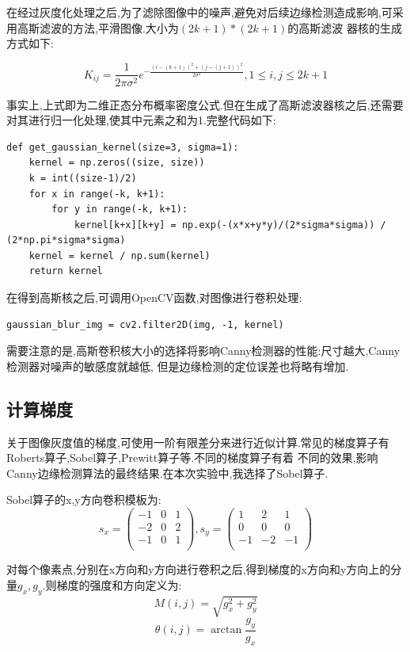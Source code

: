\documentclass[a4paper]{article}
\begin{document}
在经过灰度化处理之后,为了滤除图像中的噪声,避免对后续边缘检测造成影响,可采用高斯滤波的方法,平滑图像.大小为$(2k+1)*(2k+1)$的高斯滤波
器核的生成方式如下:

$$K_{ij} = \frac{1}{2\pi \sigma^{2}}e^{-\frac{(i-(k+1))^2 + (j-(j+1))^2}{2\sigma^2}},1\leq i,j \leq 2k+1$$

事实上,上式即为二维正态分布概率密度公式.但在生成了高斯滤波器核之后,还需要对其进行归一化处理,使其中元素之和为1.完整代码如下:

\begin{verbatim}
def get_gaussian_kernel(size=3, sigma=1):
    kernel = np.zeros((size, size))
    k = int((size-1)/2)
    for x in range(-k, k+1):
        for y in range(-k, k+1):
            kernel[k+x][k+y] = np.exp(-(x*x+y*y)/(2*sigma*sigma)) / (2*np.pi*sigma*sigma)
    kernel = kernel / np.sum(kernel)
    return kernel
\end{verbatim}

在得到高斯核之后,可调用OpenCV函数,对图像进行卷积处理:
\begin{verbatim}
gaussian_blur_img = cv2.filter2D(img, -1, kernel)
\end{verbatim}

需要注意的是,高斯卷积核大小的选择将影响Canny检测器的性能:尺寸越大,Canny检测器对噪声的敏感度就越低,
但是边缘检测的定位误差也将略有增加.

        \subsection{计算梯度}
关于图像灰度值的梯度,可使用一阶有限差分来进行近似计算.常见的梯度算子有Roberts算子,Sobel算子,Prewitt算子等.不同的梯度算子有着
不同的效果,影响Canny边缘检测算法的最终结果.在本次实验中,我选择了Sobel算子.

Sobel算子的x,y方向卷积模板为:
$$
s_x = 
\begin{pmatrix}
-1 & 0 & 1\\
-2 & 0 & 2\\ 
-1 & 0 & 1\\
\end{pmatrix} ,
s_y =
\begin{pmatrix}
1 & 2 & 1\\
0 & 0 & 0 \\
-1 & -2 & -1\\
\end{pmatrix} 
$$

对每个像素点,分别在x方向和y方向进行卷积之后,得到梯度的x方向和y方向上的分量$g_x,g_y$.则梯度的强度和方向定义为:
$$M(i,j) = \sqrt{g_{x}^{2} + g_{y}^{2}}$$
$$\theta(i,j) = \arctan{\frac{g_y}{g_x}}$$
\end{document}
